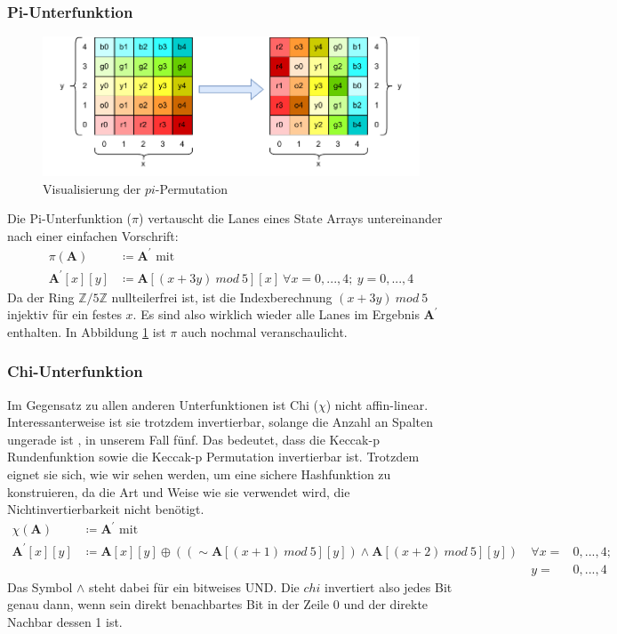\subsubsection{Pi-Unterfunktion}
\begin{figure}
    \center
    \includegraphics{images/pi.pdf}
    \caption{Visualisierung der $pi$-Permutation}
    \label{fig:definition_pi}
\end{figure}
Die Pi-Unterfunktion ($\pi$) vertauscht die Lanes eines State Arrays untereinander nach einer einfachen Vorschrift:
\begin{align*}
    \pi (\textbf{A}) & \coloneq \textbf{A}^\prime \text{ mit } \\
    \textbf{A}^\prime[x][y] & \coloneq \textbf{A}[(x + 3y)\ mod\ 5][x]\ \forall x = 0,...,4;\ y = 0,...,4
\end{align*}
Da der Ring $\mathbb{Z}/5\mathbb{Z}$ nullteilerfrei ist, ist die Indexberechnung $(x + 3y)\ mod\ 5$ injektiv für ein festes $x$.
Es sind also wirklich wieder alle Lanes im Ergebnis $\textbf{A}^\prime$ enthalten. In Abbildung \ref{fig:definition_pi} ist $\pi$
auch nochmal veranschaulicht.

\subsubsection{Chi-Unterfunktion}
Im Gegensatz zu allen anderen Unterfunktionen ist Chi ($\chi$) nicht affin-linear.
Interessanterweise ist sie trotzdem invertierbar, solange die Anzahl an Spalten ungerade ist \cite{Daemen1995CipherAH}, in unserem Fall fünf. 
Das bedeutet, dass die Keccak-p Rundenfunktion sowie die Keccak-p Permutation invertierbar ist.
Trotzdem eignet sie sich, wie wir sehen werden, um eine sichere Hashfunktion zu konstruieren,
da die Art und Weise wie sie verwendet wird, die Nichtinvertierbarkeit nicht benötigt.
\begin{align*}
    \chi (\textbf{A}) & \coloneq \textbf{A}^\prime \text{ mit } \\
    \textbf{A}^\prime[x][y] & \coloneq \textbf{A}[x][y] \oplus ((\sim \textbf{A}[(x + 1)\ mod\ 5][y]) \wedge \textbf{A}[(x + 2)\ mod\ 5][y])\ & \forall x = & 0,...,4;\\
    && y = & 0,...,4
\end{align*}
Das Symbol $\wedge$ steht dabei für ein bitweises UND.
Die $chi$ invertiert also jedes Bit genau dann, wenn sein direkt benachbartes Bit in der Zeile 0 und der direkte Nachbar dessen 1 ist.

